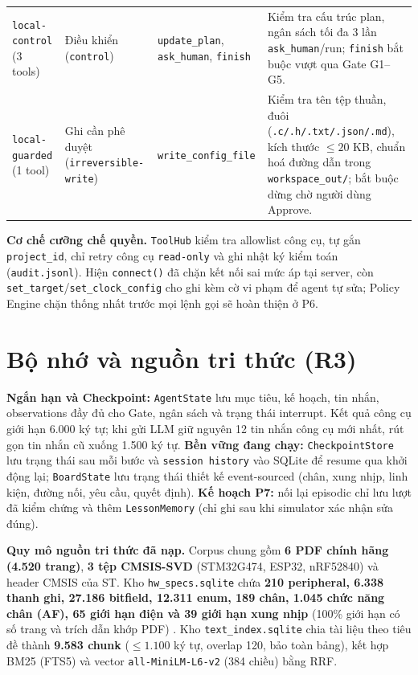 \documentclass[12pt,a4paper]{report}
\newcommand{\file}[1]{{\small\ttfamily\color{bkblue}\nolinkurl{#1}}}
\begin{document}
{\begin{tabularx}{\linewidth}{L{1.80cm}L{1.80cm}YL{4.85cm}}
\file{local-control} (3 tools) & Điều khiển (\file{control}) & \file{update_plan}, \file{ask_human}, \file{finish} & Kiểm tra cấu trúc plan, ngân sách tối đa 3 lần \file{ask_human}/run; \file{finish} bắt buộc vượt qua Gate G1–G5.\\
\file{local-guarded} (1 tool) & Ghi cần phê duyệt (\file{irreversible-write}) & \file{write_config_file} & Kiểm tra tên tệp thuần, đuôi (\file{.c/.h/.txt/.json/.md}), kích thước $\le 20$ KB, chuẩn hoá đường dẫn trong \file{workspace_out/}; bắt buộc dừng chờ người dùng Approve.\\\bottomrule
\end{tabularx}}
\par\vspace{1pt}
\textbf{Cơ chế cưỡng chế quyền.} \file{ToolHub} kiểm tra allowlist công cụ, tự gắn \file{project_id}, chỉ retry công cụ \file{read-only} và ghi nhật ký kiểm toán (\file{audit.jsonl}). Hiện \file{connect()} đã chặn kết nối sai mức áp tại server, còn \file{set_target}/\file{set_clock_config} cho ghi kèm cờ vi phạm để agent tự sửa; Policy Engine chặn thống nhất trước mọi lệnh gọi sẽ hoàn thiện ở P6.

\section{Bộ nhớ và nguồn tri thức (R3)}
\textbf{Ngắn hạn và Checkpoint:} \file{AgentState} lưu mục tiêu, kế hoạch, tin nhắn, observations đầy đủ cho Gate, ngân sách và trạng thái interrupt. Kết quả công cụ giới hạn 6.000 ký tự; khi gửi LLM giữ nguyên 12 tin nhắn công cụ mới nhất, rút gọn tin nhắn cũ xuống 1.500 ký tự. \textbf{Bền vững đang chạy:} \file{CheckpointStore} lưu trạng thái sau mỗi bước và \file{session history} vào SQLite để resume qua khởi động lại; \file{BoardState} lưu trạng thái thiết kế event-sourced (chân, xung nhịp, linh kiện, đường nối, yêu cầu, quyết định). \textbf{Kế hoạch P7:} nối lại episodic chỉ lưu lượt đã kiểm chứng và thêm \file{LessonMemory} (chỉ ghi sau khi simulator xác nhận sửa đúng).

\textbf{Quy mô nguồn tri thức đã nạp.} Corpus chung gồm \textbf{6 PDF chính hãng (4.520 trang)}, \textbf{3 tệp CMSIS-SVD} (STM32G474, ESP32, nRF52840) và header CMSIS của ST. Kho \file{hw_specs.sqlite} chứa \textbf{210 peripheral, 6.338 thanh ghi, 27.186 bitfield, 12.311 enum, 189 chân, 1.045 chức năng chân (AF), 65 giới hạn điện và 39 giới hạn xung nhịp} (100\% giới hạn có số trang và trích dẫn khớp PDF) \cite{architecture}. Kho \file{text_index.sqlite} chia tài liệu theo tiêu đề thành \textbf{9.583 chunk} ($\le 1.100$ ký tự, overlap 120, bảo toàn bảng), kết hợp BM25 (FTS5) và vector \file{all-MiniLM-L6-v2} (384 chiều) bằng RRF.
\clearpage
\end{document}
